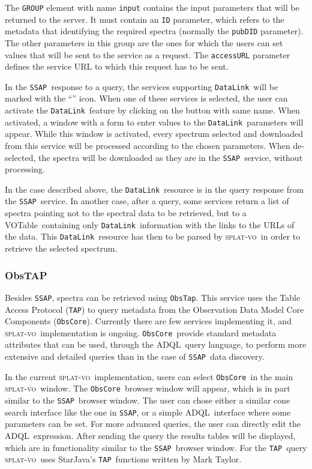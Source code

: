 \documentclass[final,authoryear,5p,times,twocolumn]{elsarticle}
\newcommand{\datalink}{\texttt{DataLink}}
\newcommand{\ssap}{\texttt{SSAP}}
\newcommand{\obstap}{\texttt{ObsTap}}
\newcommand{\tap}{\texttt{TAP}}
\newcommand{\obscore}{\texttt{ObsCore}}
\newcommand{\votable}{VOTable}
\newcommand{\adql}{ADQL}
\newcommand{\splatvo}{\textsc{splat-vo}}
\begin{document}
The \texttt{GROUP} element with name \texttt{input} contains the input
parameters that will be returned to the server.  It must contain an \texttt{ID}
parameter, which refers to the metadata that identifying the required
spectra (normally the \texttt{pubDID} parameter).  The other parameters in
this group are the ones for which the users can set values that will
be sent to the service as a request. The \texttt{accessURL} parameter defines
the service URL to which this request has to be sent.

In the \ssap\ response to a query, the services supporting \datalink\ will
be marked with the  ``''  icon. When one of these services is
selected, the user can activate the \datalink\ feature by clicking on
the button with same name. When activated, a window with a form to
enter values to the \datalink\ parameters will appear. While this window
is activated, every spectrum selected and downloaded from this service
will be processed according to the chosen parameters. When
de-selected, the spectra will be downloaded as they are in the \ssap\
service, without processing.

In the case described above, the \datalink\ resource is in the query
response from the \ssap\ service. In another case, after a query, some
services return a list of spectra pointing not to the spectral data to
be retrieved, but to a \votable\ containing only \datalink\ information
with the links to the URLs of the data. This \datalink\ resource has
then to be parsed by \splatvo\ in order to retrieve the selected spectrum.

\subsubsection{ObsTAP}

Besides \ssap, spectra can be retrieved using \obstap. This service uses
the Table Access Protocol (\tap) to query metadata from the Observation
Data Model Core Components (\obscore). Currently there are few services
implementing it, and \splatvo\ implementation is ongoing.  \obscore\
provide standard metadata attributes that can be used, through the
\adql\ query language, to perform more extensive and detailed queries
than in the case of \ssap\ data discovery.

In the current \splatvo\ implementation, users can select \obscore\ in the
main \splatvo\ window. The \obscore\ browser window will appear, which is in
part similar to the \ssap\ browser window. The user can chose either a
similar cone search interface like the one in \ssap, or a 
simple \adql\ interface where some parameters can be set. For more
advanced queries, the user can directly edit the \adql\
expression. After sending the query the results tables will be
displayed, which are in functionality similar to the \ssap\ browser
window. For the \tap\ query \splatvo\ uses StarJava's \tap\ functions written
by Mark Taylor.
\end{document}
